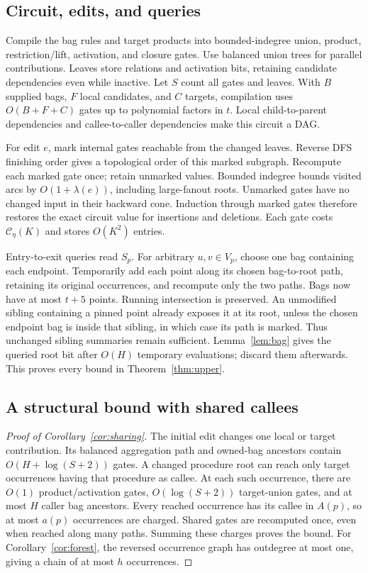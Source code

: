 \documentclass[11pt,letterpaper]{article}
\theoremstyle{definition}
\newcommand{\cost}{\mathcal C_\eta}
\begin{document}
\subsection{Circuit, edits, and queries}
Compile the bag rules and target products into bounded-indegree union,
product, restriction/lift, activation, and closure gates. Use balanced
union trees for parallel contributions. Leaves store relations and
activation bits, retaining candidate dependencies even while inactive.
Let $S$ count all gates and leaves. With $B$ supplied bags, $F$ local
candidates, and $C$ targets, compilation uses $O(B+F+C)$ gates up to
polynomial factors in $t$. Local child-to-parent dependencies and
callee-to-caller dependencies make this circuit a DAG.

For edit $e$, mark internal gates reachable from the changed leaves.
Reverse DFS finishing order gives a topological order of this marked
subgraph. Recompute each marked gate once; retain unmarked values.
Bounded indegree bounds visited arcs by $O(1+\lambda(e))$, including
large-fanout roots. Unmarked gates have no changed input in their
backward cone. Induction through marked gates therefore restores the
exact circuit value for insertions and deletions. Each gate costs
$\cost(K)$ and stores $O(K^2)$ entries.

Entry-to-exit queries read $S_p$. For arbitrary $u,v\in V_p$, choose
one bag containing each endpoint. Temporarily add each point along its
chosen bag-to-root path, retaining its original occurrences, and recompute
only the two paths. Bags now have at most $t+5$ points. Running
intersection is preserved. An unmodified sibling containing a pinned point
already exposes it at its root, unless the chosen endpoint bag is inside
that sibling, in which case its path is marked. Thus unchanged sibling
summaries remain sufficient. Lemma~\ref{lem:bag} gives the queried
root bit after $O(H)$ temporary evaluations; discard them afterwards.
This proves every bound in Theorem~\ref{thm:upper}.

\subsection{A structural bound with shared callees}
\begin{proof}[Proof of Corollary~\ref{cor:sharing}]
The initial edit changes one local or target contribution. Its balanced
aggregation path and owned-bag ancestors contain
$O(H+\log(S+2))$ gates. A changed procedure root can reach only target
occurrences having that procedure as callee. At each such occurrence,
there are $O(1)$ product/activation gates, $O(\log(S+2))$ target-union
gates, and at most $H$ caller bag ancestors. Every reached occurrence
has its callee in $A(p)$, so at most $a(p)$ occurrences are charged.
Shared gates are recomputed once, even when reached along many paths.
Summing these charges proves the bound. For
Corollary~\ref{cor:forest}, the reversed occurrence graph has outdegree
at most one, giving a chain of at most $h$ occurrences.
\end{proof}
\end{document}

